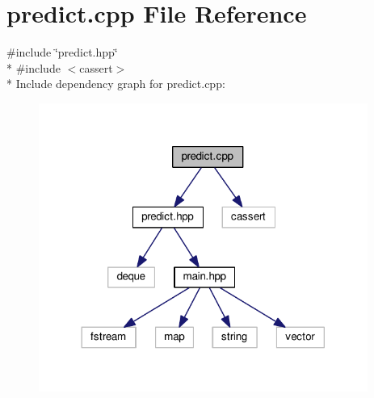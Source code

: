 \section{predict.\+cpp File Reference}
\label{predict_8cpp}
{\ttfamily \#include \char`\"{}predict.\+hpp\char`\"{}}\\*
{\ttfamily \#include $<$cassert$>$}\\*
Include dependency graph for predict.\+cpp\+:
\nopagebreak
\begin{figure}[H]
\begin{center}
\leavevmode
\includegraphics[width=305pt]{predict_8cpp__incl}
\end{center}
\end{figure}
